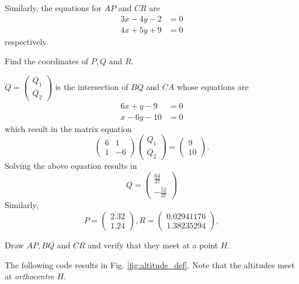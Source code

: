 \documentclass[journal,12pt,twocolumn]{IEEEtran}
\begin{document}
Similarly, the equations for $AP$ and $CR$ are
\begin{align}
3x-4y-2 &= 0
\\
4x+5y+9 &= 0
\end{align}
%
respectively.
%
\begin{problem}
Find the coordinates of $P,Q$ and $R$.
\end{problem}
\solution 
$Q = 
\begin{pmatrix}
Q_1
\\
Q_2
\end{pmatrix}
$ is the intersection of $BQ$ and $CA$ whose equations are
%
\begin{align}
6x + y \! - 9 &= 0
\\
x - 6y - 10 &= 0
\end{align}
%
which result in the matrix equation
%
\begin{equation}
\begin{pmatrix}
6 & 1
\\
1 & -6
\end{pmatrix}
\begin{pmatrix}
Q_1
\\
Q_2
\end{pmatrix}
= 
\begin{pmatrix}
9
\\
10
\end{pmatrix}.
\end{equation}
%
Solving the above equation results in
%
\begin{equation}
Q = 
\begin{pmatrix}
\frac{64}{37}
\\
-\frac{51}{37}
\end{pmatrix}
\end{equation}
%
Similarly,
\begin{equation}
P =
\begin{pmatrix}
2.32
\\
1.24
\end{pmatrix},
R = 
\begin{pmatrix}
0.02941176
\\
1.38235294
\end{pmatrix},
\end{equation}
\begin{problem}
Draw $AP, BQ$ and $CR$ and verify that they meet at a point $H$.  
\end{problem}
\solution The following code results in Fig. \ref{fig:altitude_def}. Note that the altitudes meet at {\em orthocentre} $H$.
\end{document}
